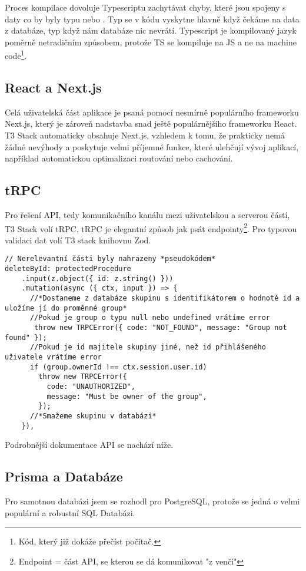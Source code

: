 Proces kompilace dovoluje Typescriptu zachytávat chyby, které jsou spojeny s daty co by byly typu  nebo . Typ  se v kódu vyskytne hlavně když čekáme na data z databáze, typ  když nám databáze nic nevrátí.
Typescript je kompilovaný jazyk poměrně netradičním způsobem, protože TS se kompiluje na JS a ne na machine code\footnote{Kód, který již dokáže přečíst počítač.}.

\subsection{React a Next.js}

Celá uživatelská část aplikace je psaná pomocí nesmírně populárního frameworku Next.js, který je zároveň nadstavba snad ještě populárnějšího frameworku React. T3 Stack automaticky obsahuje Next.js, vzhledem k tomu, že prakticky nemá žádné nevýhody a poskytuje velmi příjemné funkce, které ulehčují vývoj aplikací, například automatickou optimalizaci routování nebo cachování\cite{vercel}.

\subsection{tRPC}
Pro řešení API, tedy komunikačního kanálu mezi uživatelskou a serverou částí, T3 Stack volí tRPC. tRPC je elegantní způsob jak psát endpointy\footnote{Endpoint = část API, se kterou se dá komunikovat "z venčí"}. Pro typovou validaci dat volí T3 stack knihovnu Zod\cite{zod}.
\begin{lstlisting}[caption={Úryvek z "groups" routeru zobrazující mazání skupiny}]
// Nerelevantní části byly nahrazeny *pseudokódem*
deleteById: protectedProcedure
    .input(z.object({ id: z.string() }))
    .mutation(async ({ ctx, input }) => {
      //*Dostaneme z databáze skupinu s identifikátorem o hodnotě id a uložíme jí do proměnné group*
      //Pokud je group o typu null nebo undefined vrátíme error
       throw new TRPCError({ code: "NOT_FOUND", message: "Group not found" });
      //Pokud je id majitele skupiny jiné, než id přihlášeného uživatele vrátíme error
      if (group.ownerId !== ctx.session.user.id)
        throw new TRPCError({
          code: "UNAUTHORIZED",
          message: "Must be owner of the group",
        });
      //*Smažeme skupinu v databázi*
    }),
\end{lstlisting}
Podrobnější dokumentace API se nachází níže.

\subsection{Prisma a Databáze}
Pro samotnou databázi jsem se rozhodl pro PostgreSQL, protože se jedná o velmi populární a robustní SQL Databázi.

